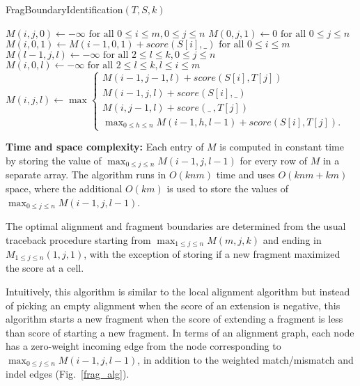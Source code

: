 \begin{algorithm}[H]
\caption{FragBoundaryIdentification$(T, S, k)$}
\begin{algorithmic}[1]
  \STATE $M(i,j,0) \leftarrow -\infty
          \text{ for all } 0 \leq i \leq m, 0 \leq j \leq n$
  \STATE $M(0,j,1) \leftarrow 0 \text{ for all } 0 \leq j \leq n$
  \STATE $M(i,0,1) \leftarrow M(i-1,0,1) + score(S[i], \_)
          \text{ for all } 0 \leq i \leq m$
  \STATE $M(l-1,j,l) \leftarrow -\infty \text{ for all } 2 \leq l \leq k,
          0 \leq j \leq n$
  \STATE $M(i,0,l) \leftarrow -\infty \text{ for all } 2 \leq l \leq k,
          l \leq i \leq m$
        \STATE $M(i,j,l) \leftarrow \max
          \begin{cases}
            M(i-1,j-1,l) + score(S[i], T[j]) \\
            M(i-1,j,l) + score(S[i], \_) \\
            M(i,j-1,l) + score(\_\ , T[j]) \\
            \max_{0 \leq h \leq n}M(i-1,h,l-1) + score(S[i], T[j]).
          \end{cases} $
      \ENDFOR
    \ENDFOR
  \ENDFOR
\end{algorithmic}
\label{gen_frag_id_alg}
\end{algorithm}

\noindent
\textbf{Time and space complexity:} Each entry of $M$ is computed in
constant time by storing the value of $\max_{0 \leq j \leq
n}M(i-1,j,l-1)$ for every row of $M$ in a separate array. The algorithm
runs in $O(knm)$ time and uses $O(knm + km)$ space, where the additional
$O(km)$ is used to store the values of $\max_{0 \leq j \leq
n}M(i-1,j,l-1)$.

The optimal alignment and fragment boundaries are determined from the
usual traceback procedure starting from $\max_{1 \leq j \leq n}M(m,j,k)$
and ending in $M_{1 \leq j \leq n}(1,j,1)$, with the exception of
storing if a new fragment maximized the score at a cell.

Intuitively, this algorithm is similar to the local alignment algorithm
but instead of picking an empty alignment when the score of an extension
is negative, this algorithm starts a new fragment when the score of
extending a fragment is less than score of starting a new fragment. In
terms of an alignment graph, each node has a zero-weight incoming edge
from the node corresponding to $\max_{0 \leq j \leq n}M(i-1,j,l-1)$, in
addition to the weighted match/mismatch and indel edges
(Fig.~\ref{frag_alg}).

